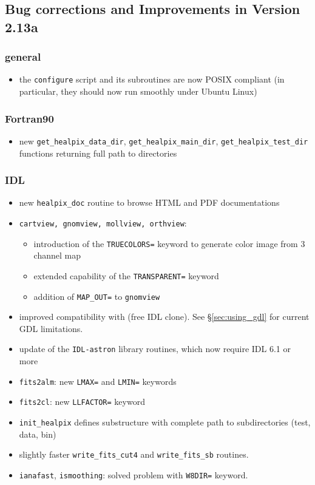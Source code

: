 \documentclass[12pt,twoside]{article}
\begin{document}
\subsection{Bug corrections and Improvements in Version 2.13a} %
%
\subsubsection[New General Improvements]{general}
\begin{itemize}
	\item the {\tt configure} script and its subroutines are now POSIX
compliant (in particular, they should now run smoothly under Ubuntu Linux)
\end{itemize}
%
\subsubsection[Fortran90]{Fortran90}
	\begin{itemize}
	\item new {\tt get\_healpix\_data\_dir}, 
	{\tt get\_healpix\_main\_dir},
	{\tt get\_healpix\_test\_dir} functions
	returning full path to \healpix directories
	\end{itemize}
%
\subsubsection[IDL]{IDL}
	\begin{itemize}
	\item new {\tt healpix\_doc} routine to browse HTML and PDF documentations
	\item {\tt cartview, gnomview, mollview, orthview}:
        \begin{itemize}
		\item introduction of the {\tt TRUECOLORS=} keyword to generate color image from 3 channel map
		\item extended capability of the {\tt TRANSPARENT=} keyword
		\item addition of {\tt MAP\_OUT=} to {\tt gnomview}
	\end{itemize}
	\item improved compatibility with 
 (free IDL
clone). See \S\ref{sec:using_gdl} for current GDL limitations.
	\item update of the {\tt IDL-astron} library routines, which now require IDL 6.1 or more
	\item {\tt fits2alm}: new {\tt LMAX=} and {\tt LMIN=} keywords
	\item {\tt fits2cl}: new {\tt LLFACTOR=}  keyword
	\item {\tt init\_healpix} defines substructure with complete path to \healpix subdirectories (test, data, bin)
	\item slightly faster {\tt write\_fits\_cut4} and {\tt write\_fits\_sb} routines.
	\item {\tt ianafast}, {\tt ismoothing}: solved problem with {\tt W8DIR=} keyword.
	\end{itemize}
\end{document}
